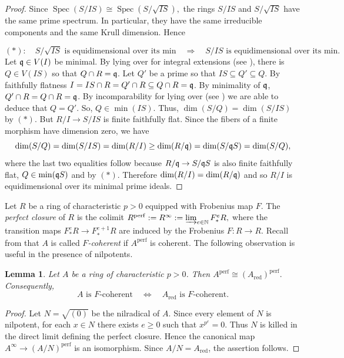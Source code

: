 \documentclass[10pt,a4paper]{amsart}
\newtheorem{lemma}[theorem]{Lemma}
\theoremstyle{definition}
\theoremstyle{remark}
\begin{document}
\begin{proof}
	Since
	$
	\operatorname{Spec}(S/IS)
	\cong
	\operatorname{Spec}(S/\sqrt{IS}),
	$ the rings \(S/ IS\) and \(S/\sqrt{IS}\) have the same prime spectrum.
	In particular, they have the same irreducible components and the same
	Krull dimension. Hence
	
	$$(\ast):\quad
	S/\sqrt{IS}\text{ is equidimensional  over its min}
	\quad\Longrightarrow\quad
	S/IS\text{ is equidimensional over its min}.
	$$
Let $\frak q\in V(I)$ be minimal. By lying over for integral extensions (see \cite[Theorem 9.3]{mat}), there is $Q\in V(IS)$ so that $Q\cap R=\frak q$. Let $Q'$ be a prime so that $IS\subseteq Q' \subseteq Q$. By faithfully flatness $I=IS\cap R= Q'	\cap R\subseteq Q	\cap R=\frak q$. By minimality of $\frak q$, $Q'	\cap R= Q	\cap R=\frak q$. By incomparability for lying over (see \cite[theorem 9.3.(ii)]{mat}) we are able to deduce that $Q=Q'$. So, $Q\in \min(IS)$. Thus, $\dim(S/Q)=\dim(S/IS)$ by  $(\ast)$. But
  \( R/I\to  S/IS\) is finite faithfully flat. Since the fibers of a
	finite morphism have dimension zero,  we have $$\dim(S/Q)=\dim(S/IS)=\dim(R/I)\geq \dim(R/\frak q)=\dim(S/\frak q S)= \dim(S/Q),$$ where the last two equalities follow because
  \(R/\frak q\to  S/\frak q S\) is also finite faithfully flat, $Q\in \min(\frak q S)$ and by $(\ast)$.	
	Therefore $\dim(R/I)= \dim(R/\frak q)$
	and so \( R/I\) is
	equidimensional over its minimal prime ideals.
\end{proof}


 	Let \(R\) be a ring of characteristic \(p>0\) equipped with Frobenius map $F$. The \emph{perfect closure} of \(R\)
is the colimit
\(
R^{\mathrm{perf}}
:=R^\infty:=
\varinjlim_{e\in\mathbb N} F_*^e R,
\)
where the transition maps \(F_*^e R\to F_*^{e+1}R\) are induced by the Frobenius
\(F\colon R\to R\).
Recall from \cite{Shi10} that $A$ is called \emph{$F$-coherent} if \(A^{\mathrm{perf}}\) is coherent.
The following observation is useful in the presence of nilpotents.

\begin{lemma}
	Let \(A\) be a ring of characteristic \(p>0\). Then
	$A^{\mathrm{perf}} \cong (A_{\mathrm{red}})^{\mathrm{perf}}.
	$
	Consequently,
	\[
	A\text{ is $F$-coherent}
	\quad\Longleftrightarrow\quad
	A_{\mathrm{red}}\text{ is $F$-coherent}.
	\]
\end{lemma}

\begin{proof}
	Let \(N=\sqrt{(0)}\) be the nilradical of \(A\). Since every element of
	\(N\) is nilpotent, for each \(x\in N\) there exists \(e\geq 0\) such that
	\(x^{p^e}=0\). Thus \(N\) is killed in the direct limit defining the
	perfect closure. Hence the canonical map
	\(A^\infty\to (A/N)^{\mathrm{perf}}\)
	is an isomorphism. Since \(A/N=A_{\mathrm{red}}\), the assertion follows.
\end{proof}
\end{document}
